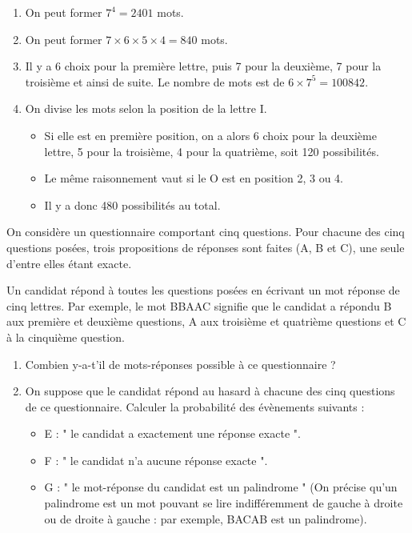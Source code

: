 \documentclass[11pt,fleqn, openany]{book} %
\begin{document}
\begin{solution}\hspace{0pt}
\vspace{-0.5cm}
\begin{enumerate}
\item On peut former $7^4=2401$ mots.
\item On peut former $7 \times 6 \times 5 \times 4 = 840$ mots.
\item Il y a 6 choix pour la première lettre, puis 7 pour la deuxième, 7 pour la troisième et ainsi de suite. Le nombre de mots est de $6 \times 7^5 = 100842$.
\item On divise les mots selon la position de la lettre I.
\begin{itemize}
\item Si elle est en première position, on a alors 6 choix pour la deuxième lettre, 5 pour la troisième, 4 pour la quatrième, soit 120 possibilités.
\item Le même raisonnement vaut si le O est en position 2, 3 ou 4.
\item Il y a donc 480 possibilités au total.
\end{itemize}
\end{enumerate}\end{solution}



\begin{exercise}[topic=comb02, subtitle={(Amérique du Sud 2009)}]

On considère un questionnaire comportant cinq questions. Pour chacune des cinq questions posées, trois propositions de réponses sont faites (A, B et C), une seule d'entre elles étant exacte.

Un candidat répond à toutes les questions posées en écrivant un mot réponse
de cinq lettres.
Par exemple, le mot BBAAC signifie que le candidat a répondu B aux première et deuxième questions, A aux troisième et quatrième questions et C à la
cinquième question.
\begin{enumerate}
\item Combien y-a-t'il de mots-réponses possible à ce questionnaire ?
\item On suppose que le candidat répond au hasard à chacune des cinq questions de ce questionnaire. Calculer la probabilité des évènements suivants :
\begin{itemize}
\item E : " le candidat a exactement une réponse exacte ".
\item F : " le candidat n'a aucune réponse exacte ".
\item G : " le mot-réponse du candidat est un palindrome " (On précise qu'un
palindrome est un mot pouvant se lire indifféremment de gauche à droite
ou de droite à gauche : par exemple, BACAB est un palindrome).\end{itemize}
\end{enumerate}\end{exercise}
\end{document}

